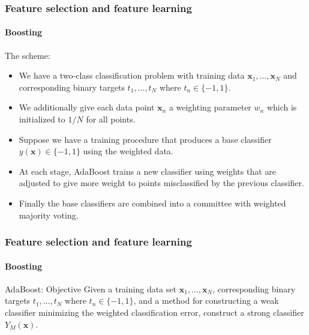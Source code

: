 \documentclass[aspectratio=169]{beamer}
\renewcommand{\vec}[1]{\boldsymbol{#1}}
\begin{document}
\begin{frame}
\frametitle{Feature selection and feature learning}
\framesubtitle{Boosting}

The scheme:
\begin{itemize}
\item We have a two-class classification problem with \alert{training
    data} $\vec{x}_1,\ldots,\vec{x}_N$ and corresponding binary
  \alert{targets} $t_1,\ldots,t_N$ where $t_n \in \{-1,1\}$.
\item We additionally give each data point $\vec{x}_n$ a
  \alert{weighting parameter} $w_n$ which is initialized to $1/N$ for
  all points.
\item Suppose we have a \alert{training procedure} that produces a
  base classifier $y(\vec{x}) \in \{-1,1\}$ using the weighted data.
\item At each stage, AdaBoost trains a new classifier using weights
  that are adjusted to give \alert{more weight} to points
  \alert{misclassified} by the previous classifier.
\item Finally the base classifiers are combined into a committee with
  \alert{weighted majority voting}.
\end{itemize}

\end{frame}


\begin{frame}
\frametitle{Feature selection and feature learning}
\framesubtitle{Boosting}

\begin{block}{AdaBoost: Objective}
Given a training data set $\vec{x}_1,\ldots,\vec{x}_N$, corresponding
binary targets $t_1,\ldots,t_N$ where $t_n \in \{-1,1\}$, and a method
for constructing a weak classifier minimizing the weighted
classification error, construct a strong classifier $Y_M(\vec{x})$.
\end{block}

\end{frame}
\end{document}
